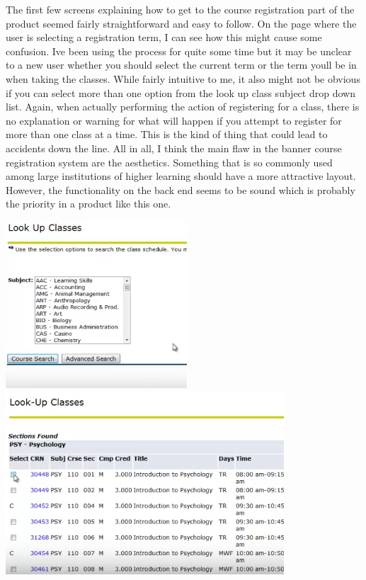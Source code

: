 \documentclass[11pt]{article}
\begin{document}
\begin{enumerate}[a)]
\begin{enumerate}[1)]
The first few screens explaining how to get to the course registration part of the product seemed fairly straightforward and easy to follow.  On the page where the user is selecting a registration term, I can see how this might cause some confusion.  I\textquotesingle ve been using the process for quite some time but it may be unclear to a new user whether you should select the current term or the term you\textquotesingle ll be in when taking the classes.  While fairly intuitive to me, it also might not be obvious if you can select more than one option from the look up class subject drop down list.  Again, when actually performing the action of registering for a class, there is no explanation or warning for what will happen if you attempt to register for more than one class at a time.  This is the kind of thing that could lead to accidents down the line.  All in all, I think the main flaw in the banner course registration system are the aesthetics.  Something that is so commonly used among large institutions of higher learning should have a more attractive layout.  However, the functionality on the back end seems to be sound which is probably the priority in a product like this one.  

\includegraphics[scale=0.5]{images/subjects} \includegraphics[scale=0.5]{images/register}
\end{enumerate}


\end{enumerate}
\end{document}

